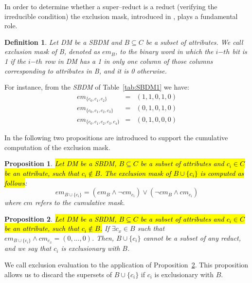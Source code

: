 \documentclass[number,preprint,review,12pt]{elsarticle}
\newtheorem{proposition}{Proposition}
\newtheorem{definition}{Definition}
\begin{document}
	In order to determine whether a super--reduct is a reduct (verifying the irreducible condition) the
	exclusion mask, introduced in \cite{Lias09}, plays a fundamental role. 
	
	\begin{definition}\label{def:exclusion}
		Let DM be a SBDM and $B \subseteq C$ be a subset of attributes. We call exclusion mask of B, denoted as $em_B$, to the binary word in which the $i{\mathit{-th}}$ bit is 1 if the $i{\mathit{-th}}$ row in DM has a 1 in only one column of those columns corresponding to attributes in B, and it is 0 otherwise.
	\end{definition}
	
	For instance, from the \textit{SBDM} of Table~\ref{tab:SBDM1} we have:
	$$\begin{array}{lcc}
	  em_{\lbrace c_0,c_1,c_2\rbrace}         &=& (1,1,0,1,0)\\
	  em_{\lbrace c_0,c_1,c_2,c_3\rbrace}     &=& (0,1,0,1,0)\\
	  em_{\lbrace c_0,c_1,c_2,c_3,c_4\rbrace} &=& (0,1,0,0,0)
	\end{array}$$
	
	In \cite{Lias13} the following two propositions are introduced to support the cumulative computation of the exclusion mask.
	
	\begin{proposition}\label{prop:cumul} 
		\hl{Let DM be a SBDM, $B \subseteq C$ be a subset of attributes and $c_i \in C$ be an attribute, such that $c_i \notin B$. The exclusion mask of $B \cup \lbrace c_i\rbrace$ is computed as follows}: $$em_{B \cup \lbrace c_i\rbrace}=(em_B \wedge \neg cm_{c_i}) \vee (\neg cm_B \wedge cm_{c_i})$$ where $cm$ refers to the cumulative mask.
	\end{proposition}
	
	
	\begin{proposition}\label{prop:exclude} 
		\hl{Let DM be a SBDM, $B \subseteq C$ be a subset of attributes and $c_i \in C$ be an attribute, such that $c_i \notin B$.} If $\exists c_x \in B$ such that $em_{B \cup \lbrace c_i\rbrace} \wedge cm_{c_x}=(0,...,0)$. Then, $B \cup \lbrace c_i\rbrace$ cannot be a subset of any reduct, and we say that $c_i$ is exclusionary with $B$.
	\end{proposition}
	
	We call exclusion evaluation to the application of Proposition~\ref{prop:exclude}. This proposition allows us to discard the supersets of $B \cup \lbrace c_i\rbrace$ if $c_i$ is exclusionary with $B$.
	
\end{document}

